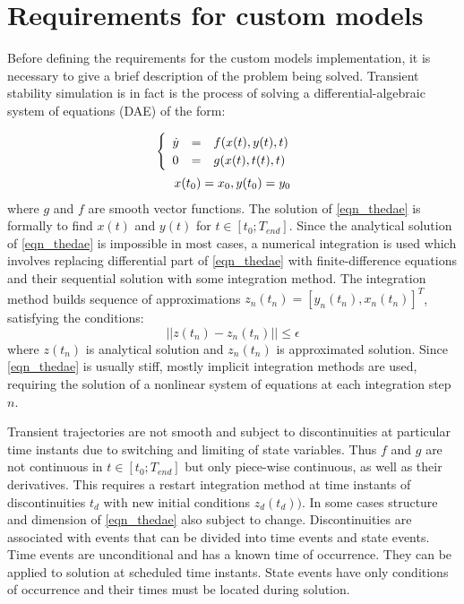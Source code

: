 \documentclass[lettersize,journal]{IEEEtran}
\begin{document}
\section{Requirements for custom models}
Before defining the requirements for the custom models implementation, it is necessary to give a brief description of the problem being solved. 
Transient stability simulation is in fact is the process of solving a differential-algebraic system of equations (DAE) of the form:

\begin{equation}
	\label{eqn_thedae}
	\begin{array}{c}
		\begin{cases}
			\begin{array}{lcl}
				\dot{y}&=&f(x(t), y(t), t) \\
			 	      0&=&g(x(t), t(t), t)\\
			\end{array}
		\end{cases} 
	\vspace{0.5em} \\
	 x(t_0)=x_0, y(t_0)=y_0 \\
	\end{array}
\end{equation}
\noindent where \(g\) and \(f\) are smooth vector functions. The solution of \eqref{eqn_thedae} is formally to find \(x(t)\) and \(y(t)\) for \(t\in[t_0;T_{end}]\). Since the analytical solution of \eqref{eqn_thedae} is impossible in most cases, a numerical integration is used which involves replacing differential part
of \eqref{eqn_thedae} with finite-difference equations and their sequential solution with some integration
method. The integration method builds sequence of approximations \(z_n(t_n)=[y_n(t_n), x_n(t_n)]^T\), satisfying
the conditions:
\begin{equation}
	\label{eqn_fdapprox}
	\vert\vert z(t_n)-z_n(t_n) \vert\vert \leq \epsilon
\end{equation}
\noindent where \(z(t_n)\) is analytical solution and \(z_n(t_n)\) is approximated solution. Since \eqref{eqn_thedae} is usually stiff,
mostly implicit integration methods are used, requiring the solution of a nonlinear system of equations at each integration step \(n\).

Transient trajectories are not smooth and subject to discontinuities at particular time instants due to switching and limiting of state variables.
Thus \(f\) and \(g\) are not continuous in \(t\in[t_0;T_{end}]\) but only piece-wise continuous, as well as their derivatives. This requires a restart integration
method at time instants of discontinuities \(t_d\) with new initial conditions \(z_d(t_d))\). In some cases structure and dimension of \eqref{eqn_thedae}
also subject to change. Discontinuities are associated with events that can be divided into time events and state events. Time events are 
unconditional and has a known time of occurrence. They can be applied to solution at scheduled time instants. State events have only conditions of occurrence and
their times must be located during solution.
\end{document}
